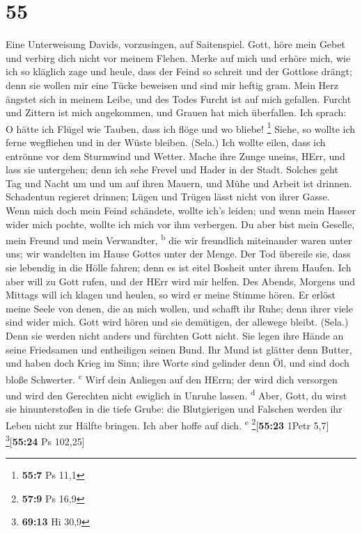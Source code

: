 \hypertarget{section-54}{%
\section{55}\label{section-54}}

 Eine Unterweisung Davids, vorzusingen, auf Saitenspiel.
 Gott, höre mein Gebet und verbirg dich nicht vor meinem
Flehen.  Merke auf mich und erhöre mich, wie ich so
kläglich zage und heule,  dass der Feind so schreit und
der Gottlose drängt; denn sie wollen mir eine Tücke beweisen und sind
mir heftig gram.  Mein Herz ängstet sich in meinem Leibe,
und des Todes Furcht ist auf mich gefallen.  Furcht und
Zittern ist mich angekommen, und Grauen hat mich überfallen.
 Ich sprach: O hätte ich Flügel wie Tauben, dass ich flöge
und wo bliebe! \footnote{\textbf{55:7} Ps 11,1}  Siehe, so
wollte ich ferne wegfliehen und in der Wüste bleiben. (Sela.)
 Ich wollte eilen, dass ich entrönne vor dem Sturmwind und
Wetter.  Mache ihre Zunge uneins, HErr, und lass sie
untergehen; denn ich sehe Frevel und Hader in der Stadt. 
Solches geht Tag und Nacht um und um auf ihren Mauern, und Mühe und
Arbeit ist drinnen.  Schadentun regieret drinnen; Lügen
und Trügen lässt nicht von ihrer Gasse.  Wenn mich doch
mein Feind schändete, wollte ich's leiden; und wenn mein Hasser wider
mich pochte, wollte ich mich vor ihm verbergen.  Du aber
bist mein Geselle, mein Freund und mein Verwandter, \textsuperscript{b}
 die wir freundlich miteinander waren unter uns; wir
wandelten im Hause Gottes unter der Menge.  Der Tod
übereile sie, dass sie lebendig in die Hölle fahren; denn es ist eitel
Bosheit unter ihrem Haufen.  Ich aber will zu Gott rufen,
und der HErr wird mir helfen.  Des Abends, Morgens und
Mittags will ich klagen und heulen, so wird er meine Stimme hören.
 Er erlöst meine Seele von denen, die an mich wollen, und
schafft ihr Ruhe; denn ihrer viele sind wider mich.  Gott
wird hören und sie demütigen, der allewege bleibt. (Sela.) Denn sie
werden nicht anders und fürchten Gott nicht.  Sie legen
ihre Hände an seine Friedsamen und entheiligen seinen Bund.
 Ihr Mund ist glätter denn Butter, und haben doch Krieg
im Sinn; ihre Worte sind gelinder denn Öl, und sind doch bloße
Schwerter. \textsuperscript{c}  Wirf dein Anliegen auf
den HErrn; der wird dich versorgen und wird den Gerechten nicht ewiglich
in Unruhe lassen. \textsuperscript{d}  Aber, Gott, du
wirst sie hinunterstoßen in die tiefe Grube: die Blutgierigen und
Falschen werden ihr Leben nicht zur Hälfte bringen. Ich aber hoffe auf
dich. \textsuperscript{e} \footnote{\textbf{57:9} Ps 16,9}{[}\textbf{55:23}
1Petr 5,7{]} \footnote{\textbf{69:13} Hi 30,9}{[}\textbf{55:24} Ps
102,25{]}

